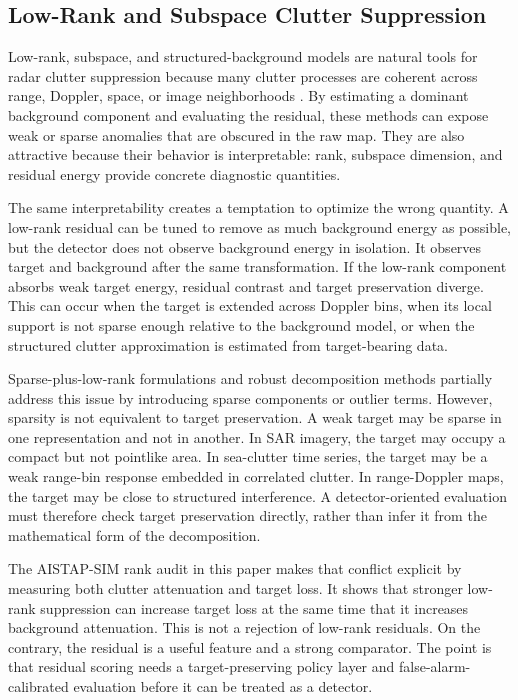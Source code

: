\documentclass[journal]{IEEEtran}
\begin{document}
\subsection{Low-Rank and Subspace Clutter Suppression}

Low-rank, subspace, and structured-background models are natural tools for radar clutter suppression because many clutter processes are coherent across range, Doppler, space, or image neighborhoods \cite{candes2011rpca,vaswani2018robustsubspace}. By estimating a dominant background component and evaluating the residual, these methods can expose weak or sparse anomalies that are obscured in the raw map. They are also attractive because their behavior is interpretable: rank, subspace dimension, and residual energy provide concrete diagnostic quantities.

The same interpretability creates a temptation to optimize the wrong quantity. A low-rank residual can be tuned to remove as much background energy as possible, but the detector does not observe background energy in isolation. It observes target and background after the same transformation. If the low-rank component absorbs weak target energy, residual contrast and target preservation diverge. This can occur when the target is extended across Doppler bins, when its local support is not sparse enough relative to the background model, or when the structured clutter approximation is estimated from target-bearing data.

Sparse-plus-low-rank formulations and robust decomposition methods partially address this issue by introducing sparse components or outlier terms. However, sparsity is not equivalent to target preservation. A weak target may be sparse in one representation and not in another. In SAR imagery, the target may occupy a compact but not pointlike area. In sea-clutter time series, the target may be a weak range-bin response embedded in correlated clutter. In range-Doppler maps, the target may be close to structured interference. A detector-oriented evaluation must therefore check target preservation directly, rather than infer it from the mathematical form of the decomposition.

The AISTAP-SIM rank audit in this paper makes that conflict explicit by measuring both clutter attenuation and target loss. It shows that stronger low-rank suppression can increase target loss at the same time that it increases background attenuation. This is not a rejection of low-rank residuals. On the contrary, the residual is a useful feature and a strong comparator. The point is that residual scoring needs a target-preserving policy layer and false-alarm-calibrated evaluation before it can be treated as a detector.
\end{document}
